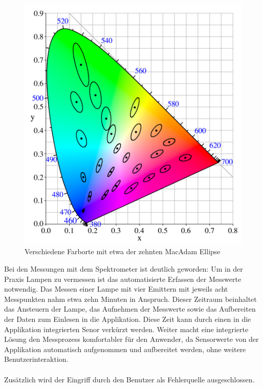 \documentclass[11pt]{scrartcl}
\begin{document}
\begin{figure}[H]
    \begin{center}
        \includegraphics[width=.8\textwidth]{images/CIExy1931MacAdam.png}
    \end{center}
    \vspace{-.4cm}
    \caption[Verschiedene Farborte mit etwa der zehnten MacAdam Ellipse]{Verschiedene Farborte mit etwa der zehnten MacAdam Ellipse \cite{macAdam}} \label{fig:macAdamExample}
\end{figure}
\noindent
Bei den Messungen mit dem Spektrometer ist deutlich geworden: Um in der Praxis Lampen zu vermessen ist das automatisierte Erfassen der Messwerte notwendig. Das
Messen einer Lampe mit vier Emittern mit jeweils acht Messpunkten nahm etwa zehn Minuten in Anspruch. Dieser Zeitraum beinhaltet das Ansteuern der Lampe, das
Aufnehmen der Messwerte sowie das Aufbereiten der Daten zum Einlesen in die Applikation. Diese Zeit kann durch einen in die Applikation integrierten Senor verkürzt
werden. Weiter macht eine integrierte Lösung den Messprozess komfortabler für den Anwender, da Sensorwerte von der Applikation automatisch aufgenommen und
aufbereitet werden, ohne weitere Benutzerinteraktion.\\
\\
Zusätzlich wird der Eingriff durch den Benutzer als Fehlerquelle ausgeschlossen.
\end{document}
